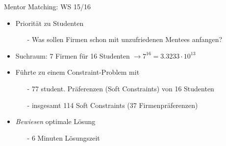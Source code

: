 \documentclass[handout,10pt,xcolor={dvipsnames},fleqn]{beamer}
\begin{document}
\begin{frame}[fragile]{Mentor Matching: WS 15/16}
\begin{itemize}
\item Priorität zu \alert{Studenten}
\begin{itemize}
\item[-] Was sollen Firmen schon mit unzufriedenen Mentees anfangen?
\end{itemize}
\item Suchraum: 7 Firmen für 16 Studenten $\rightarrow 7^{16} = 3.3233 \cdot 10^{13}$
\vspace*{2ex}
\item Führte zu einem Constraint-Problem mit
\begin{itemize}
\item[-] 77 student. Präferenzen (Soft Constraints) von 16 Studenten
\item[-] insgesamt 114 Soft Constraints (37 Firmenpräferenzen) 
\end{itemize}

\vspace*{2ex}

\item \emph{Bewiesen} optimale Lösung
\begin{itemize}
\item[-] 6 Minuten Lösungszeit
\end{itemize}
\end{itemize}
\end{frame}
\end{document}
